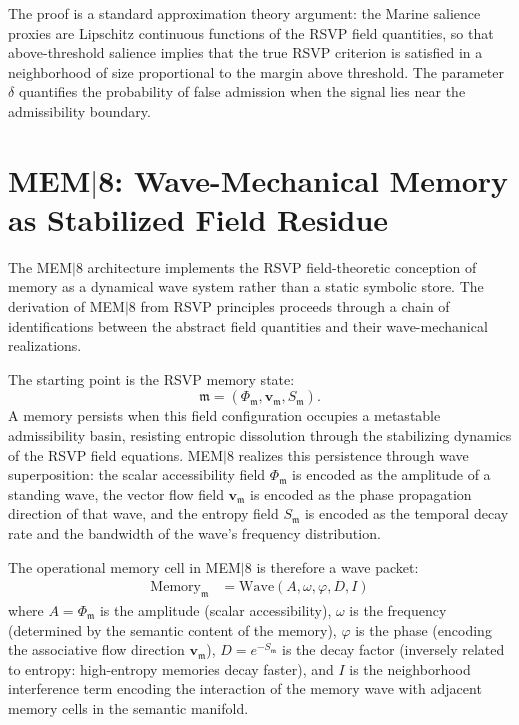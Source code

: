 \documentclass[12pt, a4paper, openany]{book}
\theoremstyle{plain}
\theoremstyle{definition}
\theoremstyle{remark}
\newcommand{\vvec}{\mathbf{v}}
\newcommand{\Sfield}{S}
\begin{document}
The proof is a standard approximation theory argument: the Marine salience proxies are Lipschitz continuous functions of the RSVP field quantities, so that above-threshold salience implies that the true RSVP criterion is satisfied in a neighborhood of size proportional to the margin above threshold. The parameter $\delta$ quantifies the probability of false admission when the signal lies near the admissibility boundary.

\section{MEM$|$8: Wave-Mechanical Memory as Stabilized Field Residue}

The MEM$|$8 architecture implements the RSVP field-theoretic conception of memory as a dynamical wave system rather than a static symbolic store. The derivation of MEM$|$8 from RSVP principles proceeds through a chain of identifications between the abstract field quantities and their wave-mechanical realizations.

The starting point is the RSVP memory state:
\[
\mathfrak{m} = (\Phi_\mathfrak{m}, \vvec_\mathfrak{m}, \Sfield_\mathfrak{m}).
\]
A memory persists when this field configuration occupies a metastable admissibility basin, resisting entropic dissolution through the stabilizing dynamics of the RSVP field equations. MEM$|$8 realizes this persistence through wave superposition: the scalar accessibility field $\Phi_\mathfrak{m}$ is encoded as the amplitude of a standing wave, the vector flow field $\vvec_\mathfrak{m}$ is encoded as the phase propagation direction of that wave, and the entropy field $\Sfield_\mathfrak{m}$ is encoded as the temporal decay rate and the bandwidth of the wave's frequency distribution.

The operational memory cell in MEM$|$8 is therefore a wave packet:
\begin{align*}
\mathrm{Memory}_\mathfrak{m} &= \mathrm{Wave}(A, \omega, \varphi, D, I)
\end{align*}
where $A = \Phi_\mathfrak{m}$ is the amplitude (scalar accessibility), $\omega$ is the frequency (determined by the semantic content of the memory), $\varphi$ is the phase (encoding the associative flow direction $\vvec_\mathfrak{m}$), $D = e^{-\Sfield_\mathfrak{m}}$ is the decay factor (inversely related to entropy: high-entropy memories decay faster), and $I$ is the neighborhood interference term encoding the interaction of the memory wave with adjacent memory cells in the semantic manifold.
\end{document}
